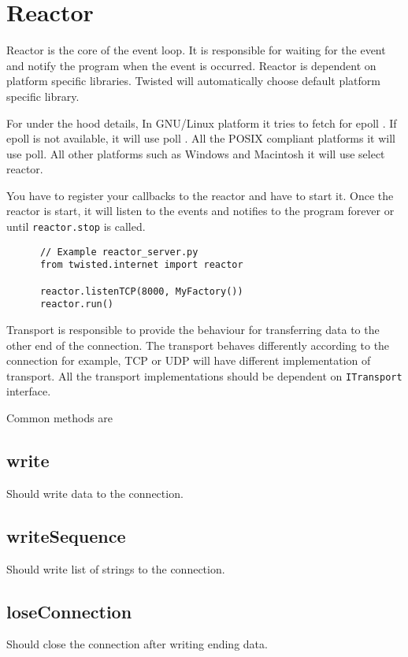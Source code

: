 \documentclass{article}
\begin{document}
  \section{Reactor}
    Reactor is the core of the event loop. It is responsible for waiting for
    the event and notify the program when the event is occurred. Reactor is
    dependent on platform specific libraries. Twisted will automatically choose
    default platform specific library.

    For under the hood details, In GNU/Linux platform it tries to fetch for
    epoll \cite{epoll}.  If epoll \cite{epoll} is not available, it will use
    poll \cite{poll}. All the POSIX compliant platforms it will use poll. All
    other platforms such as Windows and Macintosh it will use select reactor.

    You have to register your callbacks to the reactor and have to start it.
    Once the reactor is start, it will listen to the events and notifies to the
    program forever or until \texttt{reactor.stop} is called.

    \begin{verbatim}
      // Example reactor_server.py
      from twisted.internet import reactor

      reactor.listenTCP(8000, MyFactory())
      reactor.run()
    \end{verbatim}


    Transport is responsible to provide the behaviour for transferring data to
    the other end of the connection. The transport behaves differently
    according to the connection for example, TCP or UDP will have different
    implementation of transport. All the transport implementations should be
    dependent on \texttt{ITransport} interface.

    Common methods are

    \subsection{write} Should write data to the connection.

    \subsection {writeSequence} Should write list of strings to the connection.

    \subsection{loseConnection} Should close the connection after writing
    ending data.
\end{document}
